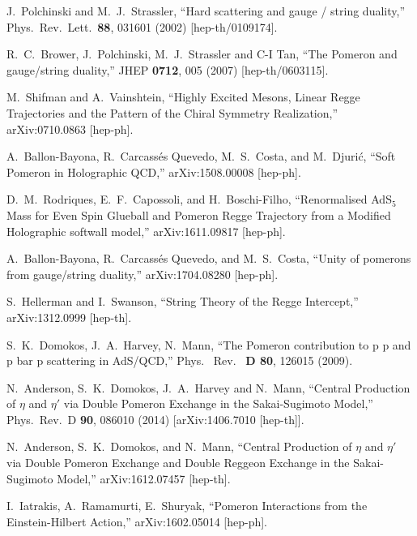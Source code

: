 \documentclass[aps, prd, preprintnumbers, floatfix, showpacs, showkeys, nofootinbib, 10pt]{revtex4-1}
\begin{document}
\begin{references}
  J.~Polchinski and M.~J.~Strassler,
  ``Hard scattering and gauge / string duality,''
  Phys.\ Rev.\ Lett.\  {\bf 88}, 031601 (2002)
  [hep-th/0109174].

  R.~C.~Brower, J.~Polchinski, M.~J.~Strassler and C-I Tan,
  ``The Pomeron and gauge/string duality,''
  JHEP {\bf 0712}, 005 (2007)
  [hep-th/0603115].

M.~Shifman and A.~Vainshtein,
``Highly Excited Mesons, Linear Regge Trajectories and the Pattern of the Chiral Symmetry Realization,''
arXiv:0710.0863 [hep-ph].

A.~Ballon-Bayona, R.~Carcass\'es Quevedo, M.~S.~Costa, and M.~Djuri\'c,
``Soft Pomeron in Holographic QCD,''
arXiv:1508.00008 [hep-ph].

D.~M.~Rodriques, E.~F.~Capossoli, and H.~Boschi-Filho,
``Renormalised AdS$_5$ Mass for Even Spin Glueball and Pomeron Regge Trajectory from a Modified Holographic softwall model,''
arXiv:1611.09817 [hep-ph].

A.~Ballon-Bayona, R.~Carcass\'es Quevedo, and M.~S.~Costa,
``Unity of pomerons from gauge/string duality,''
arXiv:1704.08280 [hep-ph].

S.~Hellerman and I.~Swanson,
``String Theory of the Regge Intercept,''
arXiv:1312.0999 [hep-th].


S.~K.~Domokos, J.~A.~Harvey, N.~Mann,
``The Pomeron contribution to p p and p bar p scattering in AdS/QCD,''
Phys. \ Rev. \ {\bf D 80}, 126015 (2009).

  N.~Anderson, S.~K.~Domokos, J.~A.~Harvey and N.~Mann,
  ``Central Production of $\eta$ and $\eta'$ via Double Pomeron Exchange in the Sakai-Sugimoto Model,''
  Phys.\ Rev.\ D {\bf 90}, 086010 (2014)
  [arXiv:1406.7010 [hep-th]].

  N.~Anderson, S.~K.~Domokos, and N.~Mann,
  ``Central Production of $\eta$ and $\eta'$ via Double Pomeron Exchange and Double Reggeon Exchange in the Sakai-Sugimoto Model,''
arXiv:1612.07457 [hep-th].

I.~Iatrakis, A.~Ramamurti, E.~Shuryak,
``Pomeron Interactions from the Einstein-Hilbert Action,''
arXiv:1602.05014 [hep-ph].


\end{references}
\end{document}
